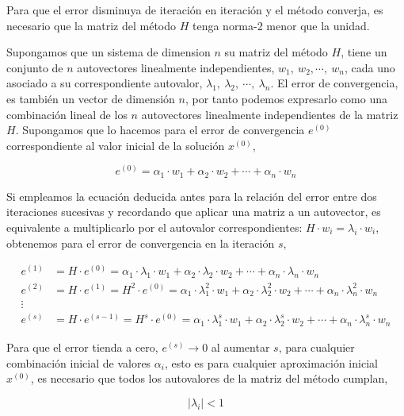 Para que el error disminuya de iteración en iteración y el método converja, es necesario que la matriz del método $H$ tenga norma-2  menor que la unidad.

Supongamos que un sistema de dimension $n$ su matriz del método $H$, tiene un conjunto de $n$ autovectores linealmente independientes, $w_1, \ w_2, \cdots, \ w_n$, cada uno asociado a su correspondiente autovalor, $\lambda_1, \ \lambda_2, \ \cdots,\ \lambda_n$. El error de convergencia, es también un vector de dimensión $n$, por tanto podemos expresarlo como una combinación lineal de los $n$ autovectores linealmente independientes de la matriz $H$. Supongamos que lo hacemos para el error de convergencia $e^{(0)}$correspondiente al valor inicial de la solución $x^{(0)}$,

\begin{equation*}
e^{(0)}=\alpha_1\cdot w_1+\alpha_2\cdot w_2+\cdots+\alpha_n\cdot w_n
\end{equation*}

Si empleamos la ecuación deducida antes para la relación del error entre dos iteraciones sucesivas y recordando que aplicar una matriz a un autovector, es equivalente a multiplicarlo por el autovalor correspondientes: $H\cdot w_i=\lambda_i\cdot w_i$, obtenemos para el error de convergencia en la iteración $s$,

\begin{align*}
e^{(1)}&=H\cdot e^{(0)}=\alpha_1\cdot \lambda_1 \cdot  w_1+\alpha_2\cdot \lambda_2 \cdot  w_2+\cdots+\alpha_n\cdot \lambda_n \cdot w_n\\
e^{(2)}&=H\cdot e^{(1)}=H^2\cdot e^{(0)}=\alpha_1\cdot \lambda_1^2 \cdot  w_1+\alpha_2\cdot \lambda_2^2 \cdot  w_2+\cdots+\alpha_n\cdot \lambda_n^2 \cdot w_n\\
\vdots \ \ \ & \\
e^{(s)}&=H\cdot e^{(s-1)}=H^s\cdot e^{(0)}=\alpha_1\cdot \lambda_1^s \cdot  w_1+\alpha_2\cdot \lambda_2^s \cdot  w_2+\cdots+\alpha_n\cdot \lambda_n^s \cdot w_n
\end{align*}

Para que el error tienda a cero, $e^{(s)}\rightarrow 0$ al aumentar $s$, para cualquier combinación inicial de valores $\alpha_i$, esto es para cualquier aproximación inicial $x^{(0)}$, es necesario que todos los autovalores de la matriz del método cumplan,

\begin{equation*}
\vert \lambda_i \vert < 1
\end{equation*}

